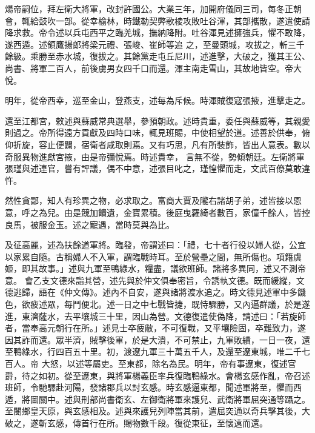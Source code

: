 \begin{pinyinscope}
 煬帝嗣位，拜左衛大將軍，改封許國公。大業三年，加開府儀同三司，每冬正朝會，輒給鼓吹一部。從幸榆林，時鐵勒契弊歌棱攻敗吐谷渾，其部攜散，遂遣使請降求救。帝令述以兵屯西平之臨羌城，撫納降附。吐谷渾見述擁強兵，懼不敢降，遂西遁。述領鷹揚郎將梁元禮、張峻、崔師等追
 之，至曼頭城，攻拔之，斬三千餘級。乘勝至赤水城，復拔之。其餘黨走屯丘尼川，述進擊，大破之，獲其王公、尚書、將軍二百人，前後虜男女四千口而還。渾主南走雪山，其故地皆空。帝大悅。



 明年，從帝西幸，巡至金山，登燕支，述每為斥候。時渾賊復寇張掖，進擊走之。



 還至江都宮，敕述與蘇威常典選舉，參預朝政。述時貴重，委任與蘇威等，其親愛則過之。帝所得遠方貢獻及四時口味，輒見班賜，中使相望於道。述善於供奉，俯仰折旋，容止便闢，宿衛者咸取則焉。又有巧思，凡有所裝飾，皆出人意表。數以奇服異物進獻宮掖，由是帝彌悅焉。時述貴幸，
 言無不從，勢傾朝廷。左衛將軍張瑾與述連官，嘗有評議，偶不中意，述張目叱之，瑾惶懼而走，文武百僚莫敢違忤。



 然性貪鄙，知人有珍異之物，必求取之。富商大賈及隴右諸胡子弟，述皆接以恩意，呼之為兒。由是競加饋遺，金寶累積。後庭曳羅綺者數百，家僮千餘人，皆控良馬，被服金玉。述之寵遇，當時莫與為比。



 及征高麗，述為扶餘道軍將。臨發，帝謂述曰：「禮，七十者行役以婦人從，公宜以家累自隨。古稱婦人不入軍，謂臨戰時耳。至於營壘之間，無所傷也。項籍虞姬，即其故事。」述與九軍至鴨綠水，糧盡，議欲班師。諸將多異同，述又不測帝意。
 會乙支文德來詣其營，述先與於仲文俱奉密旨，令誘執文德。既而緩縱，文德逃歸，語在《仲文傳》。述內不自安，遂與諸將渡水追之。時文德見述軍中多饑色，欲疲述眾，每鬥便北。述一日之中七戰皆捷，既恃驟勝，又內逼群議，於是遂進，東濟薩水，去平壤城三十里，因山為營。文德復遣使偽降，請述曰：「若旋師者，當奉高元朝行在所。」述見士卒疲敝，不可復戰，又平壤險固，卒難致力，遂因其詐而還。眾半濟，賊擊後軍，於是大潰，不可禁止，九軍敗績，一日一夜，還至鴨綠水，行四百五十里。初，渡遼九軍三十萬五千人，及還至遼東城，唯二千七百人。帝
 大怒，以述等屬吏。至東都，除名為民。明年，帝有事遼東，復述官爵，待之如初。從至遼東，與將軍楊義臣率兵復臨鴨綠水。會楊玄感作亂，帝召述班師，令馳驛赴河陽，發諸郡兵以討玄感。時玄感逼東都，聞述軍將至，懼而西遁，將圖關中。述與刑部尚書衛玄、左御衛將軍來護兒、武衛將軍屈突通等躡之。至閿鄉皇天原，與玄感相及。述與來護兒列陣當其前，遣屈突通以奇兵擊其後，大破之，遂斬玄感，傳首行在所。賜物數千段。復從東征，至懷遠而還。




\end{pinyinscope}
